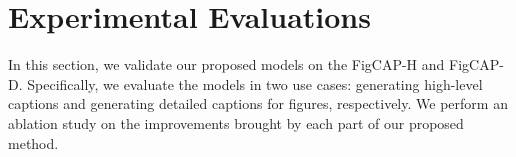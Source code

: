 \documentclass[11pt,a4paper]{article}
\begin{document}





\section{Experimental Evaluations}
\label{sec:experiment}
In this section, we validate our proposed models on the FigCAP-H and FigCAP-D. Specifically, we evaluate the models in two use cases: generating high-level captions and generating detailed captions for figures, respectively. We perform an ablation study on the improvements brought by each part of our proposed method. 

\end{document}
